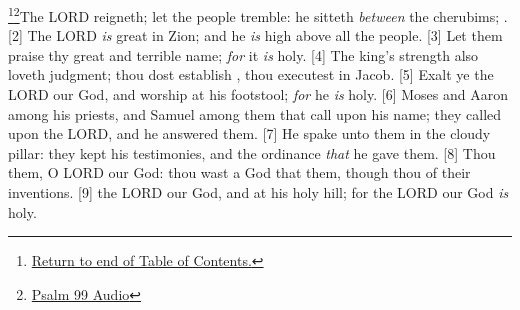 \footnote{\textcolor[cmyk]{0.99998,1,0,0}{\hyperlink{TOC}{Return to end of Table of Contents.}}}\footnote{\href{https://audiobible.com/bible/psalms_99.html}{\textcolor[cmyk]{0.99998,1,0,0}{Psalm 99 Audio}}}\textcolor[cmyk]{0.99998,1,0,0}{The LORD reigneth; let the people tremble: he sitteth \emph{between} the cherubims; .}
[2] \textcolor[cmyk]{0.99998,1,0,0}{The LORD \emph{is} great in Zion; and he \emph{is} high above all the people.}
[3] \textcolor[cmyk]{0.99998,1,0,0}{Let them praise thy great and terrible name; \emph{for} it \emph{is} holy.}
[4] \textcolor[cmyk]{0.99998,1,0,0}{The king's strength also loveth judgment; thou dost establish , thou executest  in Jacob.}
[5] \textcolor[cmyk]{0.99998,1,0,0}{Exalt ye the LORD our God, and worship at his footstool; \emph{for} he \emph{is} holy.}
[6] \textcolor[cmyk]{0.99998,1,0,0}{Moses and Aaron among his priests, and Samuel among them that call upon his name; they called upon the LORD, and he answered them.}
[7] \textcolor[cmyk]{0.99998,1,0,0}{He spake unto them in the cloudy pillar: they kept his testimonies, and the ordinance \emph{that} he gave them.}
[8] \textcolor[cmyk]{0.99998,1,0,0}{Thou  them, O LORD our God: thou wast a God that  them, though thou  of their inventions.}
[9] \textcolor[cmyk]{0.99998,1,0,0}{ the LORD our God, and  at his holy hill; for the LORD our God \emph{is} holy.}